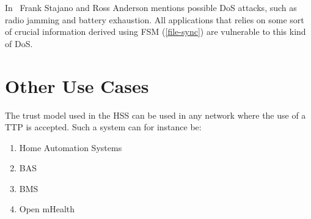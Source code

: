 In~\cite{DBLP:conf/spw/StajanoA99} Frank Stajano and Ross Anderson mentions possible \gls{DoS} attacks, such as radio jamming and battery exhaustion. 
All applications that relies on some sort of crucial information derived using \gls{FSM} (\autoref{file-sync}) are vulnerable to this kind of \gls{DoS}.

\section{Other Use Cases}
The trust model used in the \gls{HSS} can be used in any network where the use of a \gls{TTP} is accepted. 
Such a system can for instance be:
\begin{enumerate}
	\item Home Automation Systems
	\item \gls{BAS}
	\item \gls{BMS}
	\item Open mHealth
\end{enumerate}


